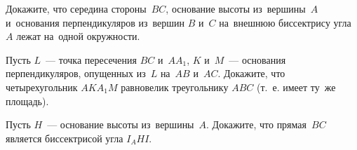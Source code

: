 \begin{problems}
\item
Докажите, что середина стороны~$BC$, основание высоты из~вершины~$A$
и~основания перпендикуляров из~вершин $B$ и~$C$ на~внешнюю биссектрису угла~$A$
лежат на~одной окружности.

\item
Пусть $L$~— точка пересечения $BC$ и~$A A_1$, $K$ и~$M$~— основания
перпендикуляров, опущенных из~$L$ на~$AB$ и~$AC$.
Докажите, что четырехугольник $A K A_1 M$ равновелик треугольнику $ABC$
(т.~е. имеет ту~же площадь).

\item
Пусть $H$~— основание высоты из~вершины~$A$.
Докажите, что прямая~$BC$ является биссектрисой угла $I_A H I$.

\end{problems}

